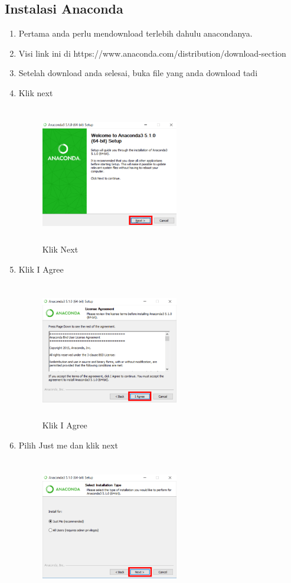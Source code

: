 \subsection{Instalasi Anaconda}
\begin{enumerate}
\item Pertama anda perlu mendownload terlebih dahulu anacondanya.
\item Visi link ini di https://www.anaconda.com/distribution/download-section
\item Setelah download anda selesai, buka file yang anda download tadi
\item Klik next
\begin{figure}[H]
\centering
\includegraphics[width=6cm,height=6cm]{figures/1.png}
\caption{Klik Next}
\label{akhir}
\end{figure}
\item Klik I Agree
\begin{figure}[H]
\centering
\includegraphics[width=6cm,height=6cm]{figures/2.png}
\caption{Klik I Agree}
\label{akhir}
\end{figure}
\item Pilih Just me dan klik next
\begin{figure}[H]
\centering
\includegraphics[width=6cm,height=6cm]{figures/3.png}

\end{figure}
\end{enumerate}
